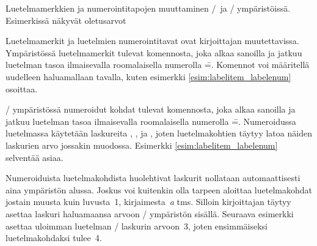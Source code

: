 \begin{esimerkki*}

\begin{koodilohko}
  \renewcommand{\labelitemi}  {\textbullet} %
  \renewcommand{\labelitemii} {\normalfont\bfseries\textendash}
  \renewcommand{\labelitemiii}{\textasteriskcentered}
  \renewcommand{\labelitemiv} {\textperiodcentered}

  \renewcommand{\labelenumi}  {\arabic{enumi}.} %
  \renewcommand{\labelenumii} {(\alph{enumii})}
  \renewcommand{\labelenumiii}{\roman{enumiii}.}
  \renewcommand{\labelenumiv} {\Alph{enumiv}.}
\end{koodilohko}
\caption{Luetelmamerkkien ja numerointitapojen muuttaminen
  \-/\ ja \-/ ympäristöissä.
  Esimerkissä näkyvät oletusarvot}
\label{esim:labelitem_labelenum}
\end{esimerkki*}

Luetelmamerkit ja luetelmien numerointitavat ovat kirjoittajan
muutettavissa. Ympäristössä  luetelmamerkit tulevat
komennosta, joka alkaa sanoilla  ja jatkuu
luetelman tasoa ilmaisevalla roomalaisella numerolla
\==. Komennot voi määritellä uudelleen haluamallaan
tavalla, kuten esimerkki \ref{esim:labelitem_labelenum} osoittaa.

\-/ ympäristössä numeroidut kohdat tulevat
komennosta, joka alkaa sanoilla  ja jatkuu
luetelman tasoa ilmaisevalla roomalaisella numerolla
\==. Numeroidussa luetelmassa käytetään laskureita
, ,  ja
, joten luetelmakohtien täytyy latoa näiden laskurien
arvo jossakin muodossa. Esimerkki \ref{esim:labelitem_labelenum}
selventää asiaa.

Numeroiduista luetelmakohdista huolehtivat laskurit nollataan
automaattisesti aina ympäristön alussa. Joskus voi kuitenkin olla
tarpeen aloittaa luetelmakohdat jostain muusta kuin luvusta~1,
kirjaimesta~\textit{a} tms. Silloin kirjoittajan täytyy asettaa laskuri
haluamaansa arvoon \-/ ympäristön sisällä. Seuraava
esimerkki asettaa uloimman luetelman \-/ laskurin
arvoon~3, joten ensimmäiseksi luetelmakohdaksi tulee~4.

